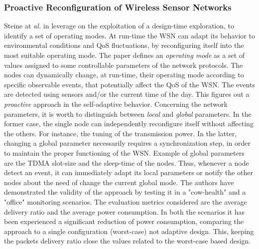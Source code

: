 \subsubsection*{Proactive Reconfiguration of Wireless Sensor Networks}
\label {ssec:proactive}

Steine at \emph{al.} in \cite{sys:proactive} leverage on the exploitation of a
design-time exploration, to identify a set of operating modes. At run-time the
WSN can adapt its behavior to environmental conditions and QoS fluctuations,
by reconfiguring itself into the most suitable operating mode.  The paper
defines an \emph{operating mode} as a set of values assigned to some
controllable parameters of the network protocols.
The nodes can dynamically change, at run-time, their operating mode according to
specific observable events, that potentially affect the QoS of the WSN. The
events are detected using sensors and/or the current time of the day. This
figures out a \emph{proactive} approach in the self-adaptive behavior.
Concerning the network parameters, it is worth to distinguish between
\emph{local} and \emph{global} parameters. In the former case, the single node
can independently reconfigure itself without affecting the others. For instance,
the tuning of the transmission power. In the latter, changing a global parameter
necessarily requires a synchronization step, in order to maintain the proper
functioning of the WSN. Example of global parameters are the TDMA slot-size and
the sleep-time of the nodes.
Thus, whenever a node detect an event, it can immediately adapt its local
parameters or notify the other nodes about the need of change the current global
mode.
The authors have demonstrated the validity of the approach by testing it in a
"cow-health" and a "office" monitoring scenarios. The evaluation metrics
considered are the average delivery ratio and the average power consumption. In
both the scenarios it has been experienced a significant reduction of power
consumption, comparing the approach to a single configuration (worst-case) not
adaptive design. This, keeping the packets delivery ratio close the values
related to the worst-case based design.


